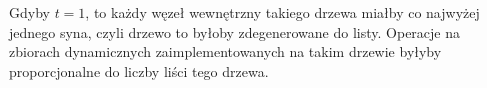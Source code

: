 
\exercise %
Gdyby $t=1$, to każdy węzeł wewnętrzny takiego drzewa miałby co najwyżej jednego syna, czyli drzewo to byłoby zdegenerowane do listy.
Operacje na zbiorach dynamicznych zaimplementowanych na takim drzewie byłyby proporcjonalne do liczby liści tego drzewa.

\exercise %
\exercise %
\exercise %
\exercise %

